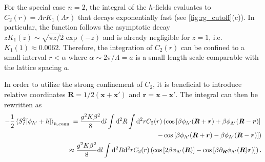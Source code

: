 For the special case $n=2$, the integral of the $h$-fields evaluates to $C_2(r)=\Lambda r K_1(\Lambda r)$ that decays exponentially fast (see \cref{fig:rg_cutoff}(c)).
In particular, the function follows the asymptotic decay $z K_1(z) \sim \sqrt{\pi z/2}\exp(-z)$ and is already negligible for $z=1$, i.e. $K_1(1)\approx0.0062$.
Therefore, the integration of $C_2(r)$ can be confined to a small interval $r<\alpha$ where $\alpha\sim2\pi/\Lambda=a$ is a small length scale comparable with the lattice spacing $a$.

In order to utilize the strong confinement of $C_2$, it is beneficial to introduce relative coordinates ${\bm R} = 1/2({\bm x}+{\bm x'})$ and ${\bm r} = {\bm x}-{\bm x'}$.
The integral can then be rewritten as
\begin{align}
    -\frac12\braket{S^2_I[\phi_{\Lambda'}+h]}_{h,{\rm conn.}}
    =
    \frac{g^2K\beta^2}8\mathrm d l\int\mathrm d^2R\int\mathrm d^2r
    C_2(r)
    \left(
        \cos\left[ \beta\phi_{\Lambda'}({\bm R}+{\bm r})+\beta\phi_{\Lambda'}({\bm R}-{\bm r}) \right]
        \right.
        \label{eq:rg_int_1}\\
        \left.-
        \cos\left[ \beta\phi_{\Lambda'}({\bm R}+{\bm r})-\beta\phi_{\Lambda'}({\bm R}-{\bm r}) \right]
    \right)
    \label{eq:rg_int_2}
    \\
    \approx
    \frac{g^2K\beta^2}{8}\mathrm d l\int\mathrm d^2R\mathrm d^2rC_2(r)
    \left(
        \cos\left[ 2\beta\phi_{\Lambda'}({\bm R}) \right]
        -
        \cos\left[ \beta\partial_{\bm R}\phi_{\Lambda'}({\bm R}){\bm r}) \right]
    \right).
    \label{eq:rg_int_rel_coords}
\end{align}

